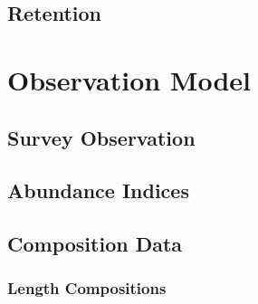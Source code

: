 \documentclass[11pt,
  english,
  letterpaper,
]{article}
\begin{document}
\leavevmode\tagmcend\tagstructend


\hypertarget{retention}{%
\subsection{Retention}\label{retention}}

\leavevmode\tagmcend\tagstructend


\hypertarget{observation-model}{%
\section{Observation Model}\label{observation-model}}

\leavevmode\tagmcend\tagstructend


\hypertarget{survey-observation}{%
\subsection{Survey Observation}\label{survey-observation}}

\leavevmode\tagmcend\tagstructend


\hypertarget{abundance-indices}{%
\subsection{Abundance Indices}\label{abundance-indices}}

\leavevmode\tagmcend\tagstructend


\hypertarget{composition-data}{%
\subsection{Composition Data}\label{composition-data}}

\leavevmode\tagmcend\tagstructend


\hypertarget{length-compositions}{%
\subsubsection{Length Compositions}\label{length-compositions}}
\end{document}
